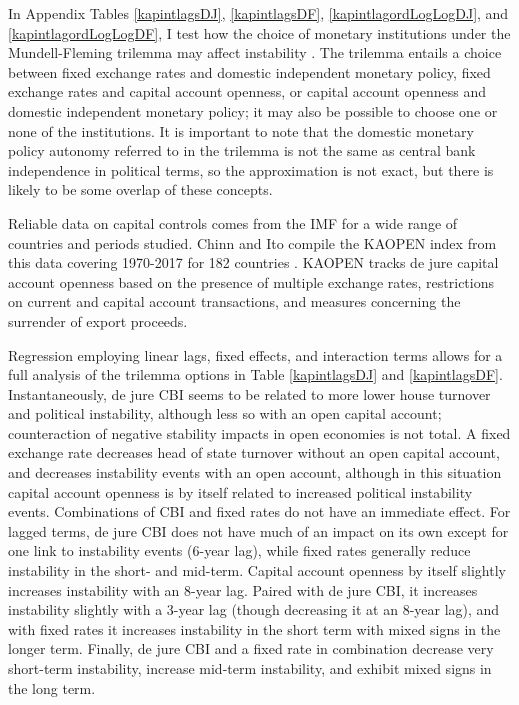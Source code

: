 \documentclass{article}
\begin{document}
    In Appendix Tables \ref*{kapintlagsDJ}, \ref*{kapintlagsDF}, \ref*{kapintlagordLogLogDJ}, and \ref*{kapintlagordLogLogDF}, I test how the choice of monetary institutions under the Mundell-Fleming trilemma may affect instability \citep{fleming_domestic_1962,mundell_capital_1963}. The trilemma entails a choice between fixed exchange rates and domestic independent monetary policy, fixed exchange rates and capital account openness, or capital account openness and domestic independent monetary policy; it may also be possible to choose one or none of the institutions. It is important to note that the domestic monetary policy autonomy referred to in the trilemma is not the same as central bank independence in political terms, so the approximation is not exact, but there is likely to be some overlap of these concepts.

    Reliable data on capital controls comes from the IMF for a wide range of countries and periods studied. Chinn and Ito compile the KAOPEN index from this data covering 1970-2017 for 182 countries \citep{chinn_what_2005}. KAOPEN tracks de jure capital account openness based on the presence of multiple exchange rates, restrictions on current and capital account transactions, and measures concerning the surrender of export proceeds.

    Regression employing linear lags, fixed effects, and interaction terms allows for a full analysis of the trilemma options in Table \ref*{kapintlagsDJ} and \ref*{kapintlagsDF}. Instantaneously, de jure CBI seems to be related to more lower house turnover and political instability, although less so with an open capital account; counteraction of negative stability impacts in open economies is not total. A fixed exchange rate decreases head of state turnover without an open capital account, and decreases instability events with an open account, although in this situation capital account openness is by itself related to increased political instability events. Combinations of CBI and fixed rates do not have an immediate effect. For lagged terms, de jure CBI does not have much of an impact on its own except for one link to instability events (6-year lag), while fixed rates generally reduce instability in the short- and mid-term. Capital account openness by itself slightly increases instability with an 8-year lag. Paired with de jure CBI, it increases instability slightly with a 3-year lag (though decreasing it at an 8-year lag), and with fixed rates it increases instability in the short term with mixed signs in the longer term. Finally, de jure CBI and a fixed rate in combination decrease very short-term instability, increase mid-term instability, and exhibit mixed signs in the long term.
\end{document}
